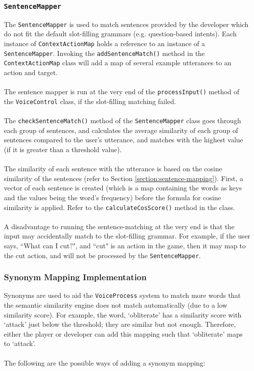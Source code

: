 \documentclass[11pt]{article}
\begin{document}
\subsubsection{\texttt{SentenceMapper}}

The \texttt{SentenceMapper} is used to match sentences provided by the developer which do not fit the default slot-filling grammars (e.g. question-based intents). Each instance of \texttt{ContextActionMap} holds a reference to an instance of a \texttt{SentenceMapper}. Invoking the \texttt{addSentenceMatch()} method in the \texttt{ContextActionMap} class will add a map of several example utterances to an action and target.
\\
\\
The sentence mapper is run at the very end of the \texttt{processInput()} method of the \texttt{VoiceControl} class, if the slot-filling matching failed.
\\
\\
The \texttt{checkSentenceMatch()} method of the \texttt{SentenceMapper} class goes through each group of sentences, and calculates the average similarity of each group of sentences compared to the user's utterance, and matches with the highest value (if it is greater than a threshold value).
\\
\\
The similarity of each sentence with the utterance is based on the cosine similarity of the sentences (refer to Section \ref{section:sentence-mapping}). First, a vector of each sentence is created (which is a map containing the words as keys and the values being the word's frequency) before the formula for cosine similarity is applied. Refer to the \texttt{calculateCosScore()} method in the class.
\\
\\
A disadvantage to running the sentence-matching at the very end is that the input may accidentally match to the slot-filling grammar. For example, if the user says, ``What can I cut?", and ``cut" is an action in the game, then it may map to the cut action, and will not be processed by the \texttt{SentenceMapper}.

\subsubsection{Synonym Mapping Implementation}

Synonyms are used to aid the \texttt{VoiceProcess} system to match more words that the semantic similarity engine does not match automatically (due to a low similarity score). For example, the word, `obliterate' has a similarity score with `attack' just below the threshold; they are similar but not enough. Therefore, either the player or developer can add this mapping such that `obliterate' maps to `attack'.
\\
\\
The following are the possible ways of adding a synonym mapping:
\end{document}
